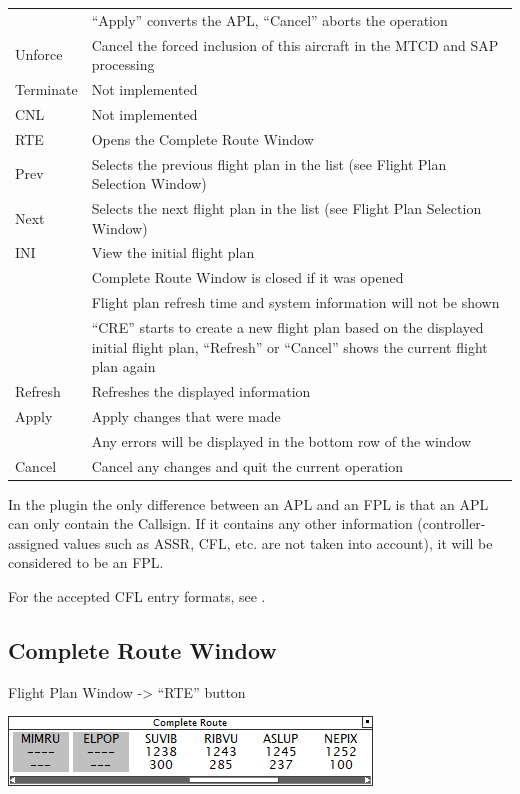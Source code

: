 \documentclass[11pt,a4paper,oldfontcommands]{memoir}
\begin{document}
\begin{tabular}{l l}
                & “Apply” converts the APL, “Cancel” aborts the operation\\
    Unforce     & Cancel the forced inclusion of this aircraft in the MTCD and SAP processing\\
    Terminate   & Not implemented\\
    CNL         & Not implemented\\
    RTE         & Opens the Complete Route Window\\
    Prev        & Selects the previous flight plan in the list (see Flight Plan Selection Window)\\
    Next        & Selects the next flight plan in the list (see Flight Plan Selection Window)\\
    INI         & View the initial flight plan\\
                & Complete Route Window is closed if it was opened\\
                & Flight plan refresh time and system information will not be shown\\
                & “CRE” starts to create a new flight plan based on the displayed initial flight plan, “Refresh” or “Cancel” shows the current flight plan again\\
    Refresh     & Refreshes the displayed information\\
    Apply       & Apply changes that were made\\
                & Any errors will be displayed in the bottom row of the window\\
    Cancel      & Cancel any changes and quit the current operation\\
\end{tabular}

In the plugin the only difference between an APL and an FPL is that an APL can only contain the Callsign. If it contains any other information (controller-assigned values such as ASSR, CFL, etc. are not taken into account), it will be considered to be an FPL.

For the accepted CFL entry formats, see \textit{}.

\subsection{Complete Route Window}
\label{win:crw}

Flight Plan Window -> “RTE” button

\includegraphics{img/route.png}
\end{document}
